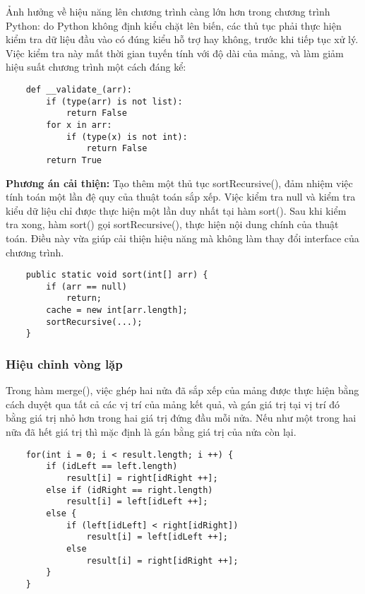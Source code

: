 \documentclass{article}
\begin{document}
    Ảnh hưởng về hiệu năng lên chương trình càng lớn hơn trong chương trình 
    Python: do Python không định kiểu chặt lên biến, các thủ tục phải thực
    hiện kiểm tra dữ liệu đầu vào có đúng kiểu hỗ trợ hay không, trước khi 
    tiếp tục xử lý. Việc kiểm tra này mất thời gian tuyến tính với độ dài 
    của mảng, và làm giảm hiệu suất chương trình một cách đáng kể:

    \begin{lstlisting}
    def __validate_(arr):
        if (type(arr) is not list):
            return False
        for x in arr:
            if (type(x) is not int):
                return False
        return True
    \end{lstlisting}

    \textbf{Phương án cải thiện:} Tạo thêm một thủ tục sortRecursive(), đảm nhiệm
    việc tính toán một lần đệ quy của thuật toán sắp xếp. Việc kiểm tra null
    và kiểm tra kiểu dữ liệu chỉ được thực hiện một lần duy nhất tại hàm sort().
    Sau khi kiểm tra xong, hàm sort() gọi sortRecursive(), thực hiện nội dung 
    chính của thuật toán. Điều này vừa giúp cải thiện hiệu năng mà không làm 
    thay đổi interface của chương trình.

    \begin{lstlisting}
    public static void sort(int[] arr) {
        if (arr == null)
            return;
        cache = new int[arr.length];
        sortRecursive(...);
    }
    \end{lstlisting}

    \subsubsection{Hiệu chỉnh vòng lặp}
    Trong hàm merge(), việc ghép hai nửa đã sắp xếp của mảng được thực hiện bằng
    cách duyệt qua tất cả các vị trí của mảng kết quả, và gán giá trị tại vị
    trí đó bằng giá trị nhỏ hơn trong hai giá trị đứng đầu mỗi nửa. Nếu như một
    trong hai nữa đã hết giá trị thì mặc định là gán bằng giá trị của nửa còn lại.

    \begin{lstlisting}
    for(int i = 0; i < result.length; i ++) {
        if (idLeft == left.length)
            result[i] = right[idRight ++];
        else if (idRight == right.length)
            result[i] = left[idLeft ++];
        else {
            if (left[idLeft] < right[idRight])
                result[i] = left[idLeft ++];
            else
                result[i] = right[idRight ++];
        }
    }
    \end{lstlisting}
\end{document}
